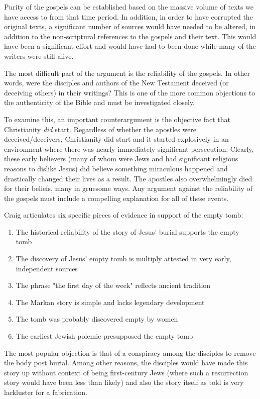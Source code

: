 \documentclass[12pt]{turabian-researchpaper}
\begin{document}
Purity of the gospels can be established based on the massive volume of texts we have access to from that time period. In addition, in order to have corrupted the original texts, a significant number of sources would have needed to be altered, in addition to the non-scriptural references to the gospels and their text. This would have been a significant effort and would have had to been done while many of the writers were still alive.

The most difficult part of the argument is the reliability of the gospels. In other words, were the disciples and authors of the New Testament deceived (or deceiving others) in their writings? This is one of the more common objections to the authenticity of the Bible and must be investigated closely.

To examine this, an important counterargument is the objective fact that Christianity \textit{did} start. Regardless of whether the apostles were deceived/deceivers, Christianity did start and it started explosively in an environment where there was nearly immediately significant persecution. Clearly, these early believers (many of whom were Jews and had significant religious reasons to dislike Jesus) did believe something miraculous happened and drastically changed their lives as a result. The apostles also overwhelmingly died for their beliefs, many in gruesome ways. Any argument against the reliability of the gospels must include a compelling explanation for all of these events.

Craig articulates six specific pieces of evidence in support of the empty tomb:\autocite[pg.361-369]{craig2008reasonable}

\begin{enumerate}
\item The historical reliability of the story of Jesus' burial supports the empty tomb
\item The discovery of Jesus' empty tomb is multiply attested in very early, independent sources
\item The phrase "the first day of the week" reflects ancient tradition
\item The Markan story is simple and lacks legendary development
\item The tomb was probably discovered empty by women
\item The earliest Jewish polemic presupposed the empty tomb
\end{enumerate}

The most popular objection is that of a conspiracy among the disciples to remove the body post burial. Among other reasons, the disciples would have made this story up without context of being first-century Jews (where such a resurrection story would have been less than likely) and also the story itself as told is very lackluster for a fabrication.
\end{document}
